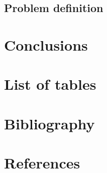 \documentclass[12pt,letterpaper]{article}
\begin{document}
\subsection{Problem definition}

\section{Conclusions}

\section{List of tables}

\section{Bibliography}

\section{References}
\end{document}
